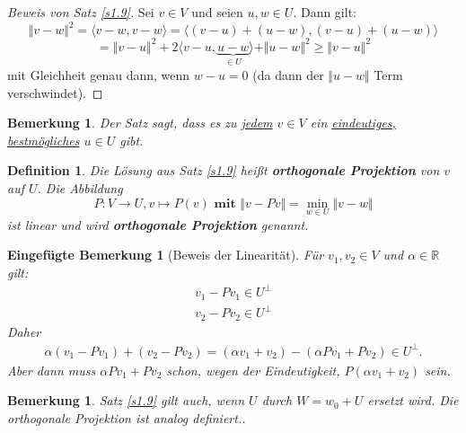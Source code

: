 \documentclass{book}
\newtheorem{definition}[algorithm]{Definition}
\newtheorem{remark}[algorithm]{Bemerkung}
\newtheorem*{mremark}{Eingefügte Bemerkung}
\def\R{\mathbb{R}}
\begin{document}
            \begin{proof}[Beweis von Satz \ref*{s1.9}]
                Sei $v\in V$ und seien $u,w\in U$. Dann gilt:
                \begin{equation*}
                    \Vert v-w \Vert^2=\langle v-w,v-w \rangle = \langle (v-u)+(u-w),(v-u)+(u-w) \rangle
                \end{equation*}
                \begin{equation*}
                    =\Vert v-u \Vert^2+2 \langle v-u,\underbrace{u-w}_{\in U} \rangle +\Vert u-w \Vert^2\geq \Vert v-u \Vert^2
                \end{equation*}
                mit Gleichheit genau dann, wenn $w-u=0$ (da dann der $\Vert u-w \Vert$ Term verschwindet).
            \end{proof}
            \begin{remark}\label{b1.11} 
                Der Satz sagt, dass es zu \underline{jedem} $v\in V$ ein \underline{eindeutiges, bestmögliches} $u\in U$ gibt.
            \end{remark}
            \begin{definition}\label{d1.12} 
                Die Lösung aus Satz \ref*{s1.9} heißt \textbf{orthogonale Projektion} von $v$ auf $U$. Die Abbildung 
                \begin{equation*}
                    P:V\to U, v\mapsto P(v) \textbf{ mit } \Vert v-Pv \Vert=\min_{w\in U}\Vert v-w \Vert
                \end{equation*}
                ist linear und wird \textbf{orthogonale Projektion} genannt.
            \end{definition}
            \begin{mremark}[Beweis der Linearität]
                Für $v_1,v_2\in V$ und $\alpha\in \R$ gilt:
                \begin{align*}
                    v_1-Pv_1\in U^\perp\\
                    v_2-Pv_2\in U^\perp 
                \end{align*}
                Daher 
                \begin{align*}
                    \alpha(v_1-Pv_1)+(v_2-Pv_2)=(\alpha v_1+v_2) - (\alpha Pv_1 + Pv_2) \in U^\perp.
                \end{align*}
                Aber dann muss $\alpha Pv_1+Pv_2$ schon, wegen der Eindeutigkeit, $P(\alpha v_1+v_2)$ sein.
            \end{mremark}
            \begin{remark}\label{b1.13}
                Satz \ref{s1.9} gilt auch, wenn $U$ durch $W=w_0+U$ ersetzt wird.
                Die orthogonale Projektion ist analog definiert..
            \end{remark}
\end{document}
